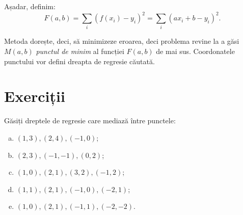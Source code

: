 Așadar, definim:
\[
  F(a, b) = \sum_i (f(x_i) - y_i)^2 = \sum_i (ax_i + b - y_i)^2.
\]

Metoda dorește, deci, să minimizeze eroarea, deci problema revine la a găsi
$ M(a, b) $ \emph{punctul de minim} al funcției $ F(a, b) $ de mai sus.
Coordonatele punctului vor defini dreapta de regresie căutată.


\section{Exerciții}

Găsiți dreptele de regresie care mediază între punctele:
\begin{enumerate}[(a)]
\item $ (1, 3), (2, 4), (-1, 0) $;
\item $ (2, 3), (-1, -1), (0, 2) $;
\item $ (1, 0), (2, 1), (3, 2), (-1, 2) $;
\item $ (1, 1), (2, 1), (-1, 0), (-2, 1) $;
\item $ (1, 0), (2, 1), (-1, 1), (-2, -2) $.
\end{enumerate}



